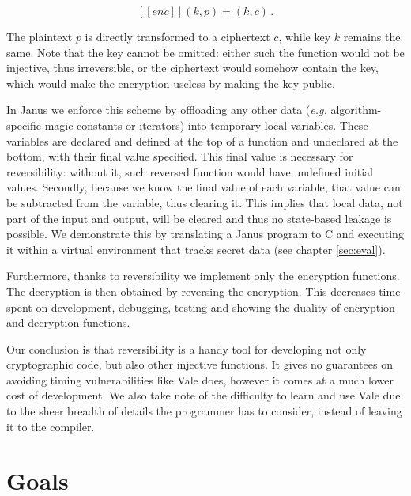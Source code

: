 \documentclass[a4paper,10pt,openright]{memoir}
\newcommand{\eg}{\emph{e.g.}\xspace}
\def\enc{\ensuremath{\mathit{enc}}}
\newcommand{\exe}[1]{\ensuremath{[\![#1]\!]}}
\begin{document}
$$
\exe{\enc}(k,p) = (k,c) \,.
$$

The plaintext $p$ is directly transformed to a ciphertext $c$, while 
key $k$ remains the same. Note that the key cannot be omitted: either 
such the function would not be injective, thus irreversible, or the 
ciphertext would somehow contain the key, which would make the 
encryption useless by making the key public. 

In Janus we enforce this scheme by offloading any other data (\eg algorithm-specific magic constants or iterators) into 
temporary local variables. These variables are declared and defined at 
the top of a function and undeclared at the bottom, with their final 
value specified. This final value is necessary for reversibility: 
without it, such reversed function would have undefined initial values. 
Secondly, because we know the final value of each variable, that value 
can be subtracted from the variable, thus clearing it. This implies 
that local data, not part of the input and output, will be cleared and 
thus no state-based leakage is possible. We demonstrate this by 
translating a Janus program to C and executing it within a virtual 
environment that tracks secret data (see chapter \ref{sec:eval}).

Furthermore, thanks to reversibility we implement only the encryption 
functions. The decryption is then obtained by reversing the encryption. 
This decreases time spent on development, debugging, testing and 
showing the duality of encryption and decryption functions.

Our conclusion is that reversibility is a handy tool for developing not 
only cryptographic code, but also other injective functions. It gives 
no guarantees on avoiding timing vulnerabilities like Vale does, 
however it comes at a much lower cost of development. We also take note 
of the difficulty to learn and use Vale due to the sheer breadth of 
details the programmer has to consider, instead of leaving it to the 
compiler.









\section{Goals}
\label{sec:goals}
\end{document}
